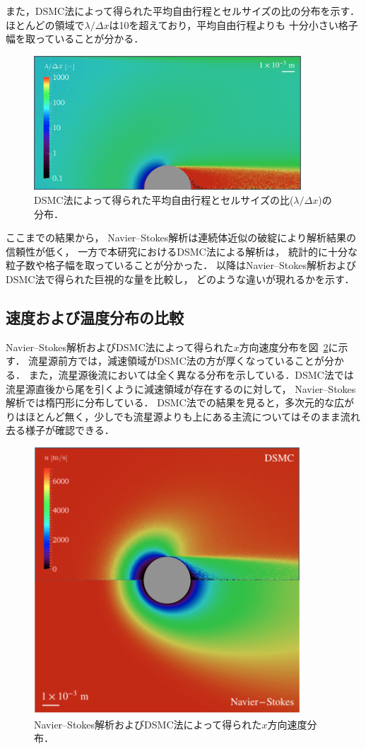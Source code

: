 また，DSMC法によって得られた平均自由行程とセルサイズの比の分布を示す．
ほとんどの領域で$\lambda/\Delta x$は10を超えており，平均自由行程よりも
十分小さい格子幅を取っていることが分かる．
\begin{figure}[H]
    \centering
    \includegraphics[width=10cm,clip]{fig/min_knud/dsmc/lambda_dx.png}
    \caption{DSMC法によって得られた平均自由行程とセルサイズの比($\lambda/\Delta x$)の分布．}
    \label{fig:dsmc-kn}
\end{figure}

ここまでの結果から，
Navier–Stokes解析は連続体近似の破綻により解析結果の信頼性が低く，
一方で本研究におけるDSMC法による解析は，
統計的に十分な粒子数や格子幅を取っていることが分かった．
以降はNavier–Stokes解析およびDSMC法で得られた巨視的な量を比較し，
どのような違いが現れるかを示す．


\subsection{速度および温度分布の比較}
Navier–Stokes解析およびDSMC法によって得られた$x$方向速度分布を図~\ref{fig:comparison-u}に示す．
流星源前方では，減速領域がDSMC法の方が厚くなっていることが分かる．
また，流星源後流においては全く異なる分布を示している．DSMC法では流星源直後から尾を引くように減速領域が存在するのに対して，
Navier–Stokes解析では楕円形に分布している．
DSMC法での結果を見ると，多次元的な広がりはほとんど無く，少しでも流星源よりも上にある主流についてはそのまま流れ去る様子が確認できる．
\begin{figure}[H]
    \centering
    \includegraphics[width=10cm,clip]{fig/min_knud/comparison/u-crop}
    \caption{Navier–Stokes解析およびDSMC法によって得られた$x$方向速度分布．}
    \label{fig:comparison-u}
\end{figure}


